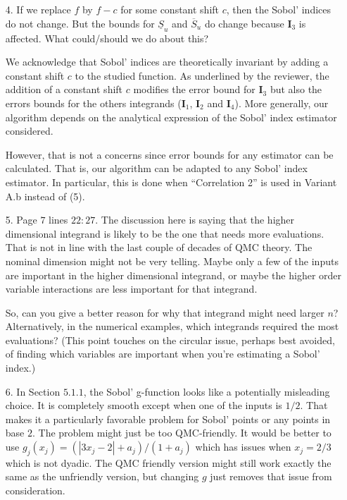 \documentclass[10pt,a4paper]{article}
\newcommand{\vect}[1]{\boldsymbol{\mathbf{#1}}}
\newcommand{\vI}{\vect{I}}
\begin{document}
\begin{itemize}
\item[4.]If we replace $f$ by $f-c$ for some constant shift $c$, then the Sobol' indices do not change. But the bounds for $\underline{S}_u$ and $\overline{S}_u$ do change because $\vI_3$ is affected. What could/should we do about this?

{\color {blue} We acknowledge that Sobol' indices are theoretically invariant by adding a constant shift $c$ to the studied function. As underlined by the reviewer, the addition of a constant shift $c$ modifies the error bound for $\vI_3$ but also the errors bounds for the others integrands ($\vI_1$, $\vI_2$ and $\vI_4$). More generally, our algorithm depends on the analytical expression of the Sobol' index estimator considered.

However, that is not a concerns since error bounds for any estimator can be calculated. That is, our algorithm can be adapted to any Sobol' index estimator. In particular, this is done when ``Correlation 2'' is used in Variant A.b instead of (5).}


\item[5.] Page $7$ lines $22:27$. The discussion here is saying that the higher dimensional integrand is likely to be the one that needs more evaluations. That is not in line with the last couple of decades of QMC theory. The nominal dimension might not be very telling. Maybe only a few of the inputs are important in the higher dimensional integrand, or maybe the higher order variable interactions are less important for that integrand.

So, can you give a better reason for why that integrand might need larger $n$? Alternatively, in the numerical examples, which integrands required the most evaluations?
(This point touches on the circular issue, perhaps best avoided, of finding which variables are important when you're estimating a Sobol' index.)

\item[6.] In Section $5.1.1$, the Sobol' g-function looks like a potentially misleading choice. It is completely smooth except when one of the inputs is $1/2$.
That makes it a particularly favorable problem for Sobol' points or any points in base $2$. The problem might just be too QMC-friendly. It would be better to use $g_j(x_j) = (|3x_j-2| + a_j)/(1 + a_j)$ which has issues when
$x_j = 2/3$ which is not dyadic. The QMC friendly version might still work exactly the same as the unfriendly version, but changing $g$ just removes that issue from consideration.


\end{itemize}
\end{document}
